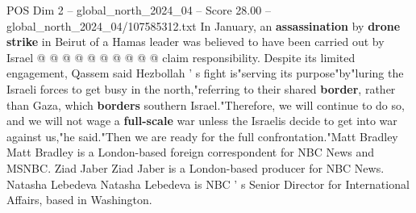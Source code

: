 \begin{textsample}{POS Dim 2 – global\_north\_2024\_04 – Score 28.00 – global\_north\_2024\_04/107585312.txt}
In January, an \textbf{assassination} by \textbf{drone} \textbf{strike} in Beirut of a Hamas leader was believed to have been carried out by Israel @ @ @ @ @ @ @ @ @ @ claim responsibility.
Despite its limited engagement, Qassem said Hezbollah ' s fight is"serving its purpose"by"luring the Israeli forces to get busy in the north,"referring to their shared \textbf{border}, rather than Gaza, which \textbf{borders} southern Israel."Therefore, we will continue to do so, and we will not wage a \textbf{full-scale} war unless the Israelis decide to get into war against us,"he said."Then we are ready for the full confrontation."Matt Bradley Matt Bradley is a London-based foreign correspondent for NBC News and MSNBC.
Ziad Jaber Ziad Jaber is a London-based producer for NBC News.
Natasha Lebedeva Natasha Lebedeva is NBC ' s Senior Director for International Affairs, based in Washington.

\end{textsample}
